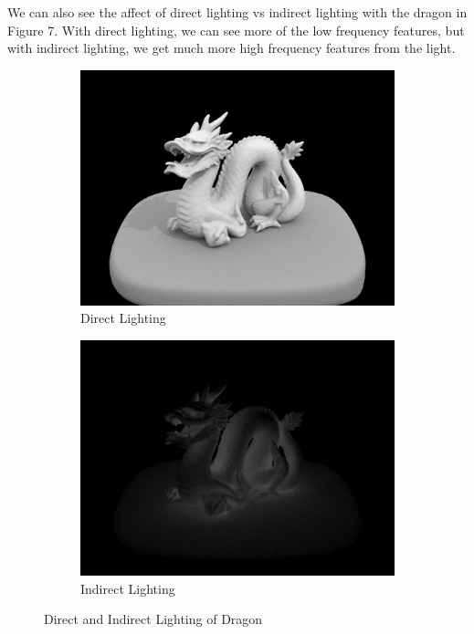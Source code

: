 \documentclass{article}
\begin{document}
We can also see the affect of direct lighting vs indirect lighting with the dragon in Figure 7. With direct lighting, we can see more of the low frequency features, but with indirect lighting, we get much more high frequency features from the light.
\begin{figure}[htb!]
\begin{subfigure}[h]{0.4\textwidth}
\includegraphics[width=\textwidth]{task4/dragon_direct.png}
\caption{Direct Lighting}
\end{subfigure}
\hfill\vrule\hfill
\begin{subfigure}[h]{0.4\textwidth}
\includegraphics[width=\textwidth]{task4/dragon_indirect.png}
\caption{Indirect Lighting}
\end{subfigure}%

\caption[f2]{Direct and Indirect Lighting of Dragon}
\end{figure}
\end{document}
